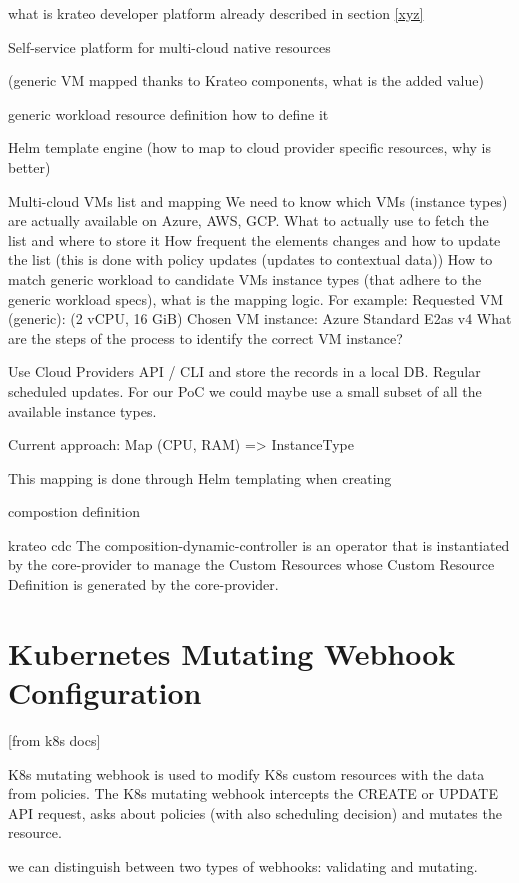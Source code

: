what is krateo
developer platform
already described in section \ref{xyz}

Self-service platform for multi-cloud native resources

(generic VM mapped thanks to Krateo components, what is the added value)

generic workload resource definition
how to define it


Helm template engine (how to map to cloud provider specific resources, why is better)


Multi-cloud VMs list and mapping
We need to know which VMs (instance types) are actually available on Azure, AWS, GCP.
What to actually use to fetch the list and where to store it
How frequent the elements changes and how to update the list (this is done with policy updates (updates to contextual data))
How to match generic workload to candidate VMs instance types (that adhere to the generic workload specs), what is the mapping logic.
For example:
Requested VM (generic): (2 vCPU, 16 GiB)
Chosen VM instance: Azure Standard E2as v4
What are the steps of the process to identify the correct VM instance?

Use Cloud Providers API / CLI and store the records in a local DB. Regular scheduled updates.
For our PoC we could maybe use a small subset of all the available instance types.

Current approach:
Map (CPU, RAM) => InstanceType

This mapping is done through Helm templating when creating 

compostion definition


krateo cdc
The composition-dynamic-controller is an operator that is instantiated by the core-provider to manage the Custom Resources whose Custom Resource Definition is generated by the core-provider.

\section{Kubernetes Mutating Webhook Configuration}

[from k8s docs]

K8s mutating webhook is used to modify K8s custom resources with the data from policies. 
The K8s mutating webhook intercepts the CREATE or UPDATE API request, asks about policies (with also scheduling decision) and mutates the resource.

we can distinguish between two types of webhooks: validating and mutating.

